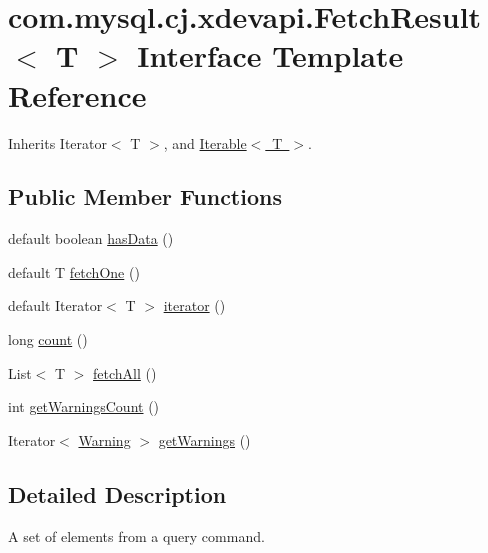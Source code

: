 \hypertarget{interfacecom_1_1mysql_1_1cj_1_1xdevapi_1_1_fetch_result}{}\section{com.\+mysql.\+cj.\+xdevapi.\+Fetch\+Result$<$ T $>$ Interface Template Reference}
\label{interfacecom_1_1mysql_1_1cj_1_1xdevapi_1_1_fetch_result}


Inherits Iterator$<$ T $>$, and \mbox{\hyperlink{class_iterable}{Iterable$<$ T $>$}}.

\subsection*{Public Member Functions}
\begin{DoxyCompactItemize}
\item 
default boolean \mbox{\hyperlink{interfacecom_1_1mysql_1_1cj_1_1xdevapi_1_1_fetch_result_acb85a5473a550decd72e07fddf950358}{has\+Data}} ()
\item 
default T \mbox{\hyperlink{interfacecom_1_1mysql_1_1cj_1_1xdevapi_1_1_fetch_result_ad5e5532da2f3d92187cfdfb6a1c5f3db}{fetch\+One}} ()
\item 
default Iterator$<$ T $>$ \mbox{\hyperlink{interfacecom_1_1mysql_1_1cj_1_1xdevapi_1_1_fetch_result_a98165eec59f65bc0dfb8e96b9ddce40c}{iterator}} ()
\item 
long \mbox{\hyperlink{interfacecom_1_1mysql_1_1cj_1_1xdevapi_1_1_fetch_result_acd63b4c5515ea1932ea1333544deb5b4}{count}} ()
\item 
List$<$ T $>$ \mbox{\hyperlink{interfacecom_1_1mysql_1_1cj_1_1xdevapi_1_1_fetch_result_ac6b0c7cf034f9137539e36bf4a2efb57}{fetch\+All}} ()
\item 
int \mbox{\hyperlink{interfacecom_1_1mysql_1_1cj_1_1xdevapi_1_1_fetch_result_aa7381aaeb95c8fcc7ec6166ed02e2780}{get\+Warnings\+Count}} ()
\item 
Iterator$<$ \mbox{\hyperlink{interfacecom_1_1mysql_1_1cj_1_1protocol_1_1_warning}{Warning}} $>$ \mbox{\hyperlink{interfacecom_1_1mysql_1_1cj_1_1xdevapi_1_1_fetch_result_ae7e96688f6f01a6c8a932dadf65a6daf}{get\+Warnings}} ()
\end{DoxyCompactItemize}


\subsection{Detailed Description}
A set of elements from a query command.


